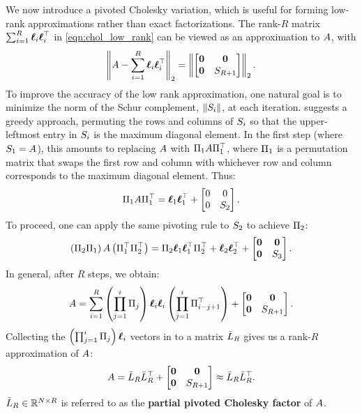 We now introduce a pivoted Cholesky variation, which is useful for forming low-rank approximations rather than exact factorizations.
The rank-$R$ matrix $\sum_{i=1}^{R}{\boldsymbol{\ell}}_{i}{\boldsymbol{\ell}}_{i}^{\top}$ in \cref{eqn:chol_low_rank} can be viewed as an approximation to $A$, with
$$
  \left\Vert A - \sum_{i=1}^{R}{\boldsymbol{\ell}}_{i}{\boldsymbol{\ell}}_{i}^{\top} \right\Vert_{2} = \left\Vert \begin{bmatrix} \mathbf{0} & \mathbf{0} \\ \mathbf{0} & S_{R+1} \end{bmatrix} \right\Vert_2.
$$
%
To improve the accuracy of the low rank approximation, one natural goal is to minimize the norm of the Schur complement, $\Vert S_{i} \Vert$, at each iteration.
\citet{harbrecht2012low} suggests a greedy approach, permuting the rows and columns of $S_{i}$ so that the upper-leftmost entry in $S_{i}$ is the maximum diagonal element.
In the first step (where $S_1 = A$), this amounts to replacing $A$ with $\Pi_{1} A \Pi_{1}^\top$, where $\Pi_{1}$ is a permutation matrix that swaps the first row and column with whichever row and column corresponds to the maximum diagonal element.
Thus:
%
\begin{align*}
  \Pi_{1} A \Pi_{1}^\top = \boldsymbol{\ell}_{1}\boldsymbol{\ell}_{1}^{\top} + \begin{bmatrix} 0 & 0 \\ 0 & S_2 \end{bmatrix}.
\end{align*}
%
To proceed, one can apply the same pivoting rule to $S_2$ to achieve $\Pi_{2}$:
%
\begin{align*}
  \left( \Pi_{2} \Pi_{1} \right) A \left( \Pi_{1}^\top \Pi_{2}^\top \right) = \Pi_{2} \boldsymbol{\ell}_{1}\boldsymbol{\ell}_{1}^{\top} \Pi_2^\top
  + \boldsymbol{\ell}_2 \boldsymbol{\ell}_2^\top + \begin{bmatrix} \mathbf{0} & \mathbf{0} \\ \mathbf{0} & S_3 \end{bmatrix}.
\end{align*}
%
In general, after $R$ steps, we obtain:
\begin{align}
  A = \sum_{i=1}^{R} \left( \prod_{j=1}^i \Pi_j \right) {\boldsymbol{\ell}}_{i} {\boldsymbol{\ell}}_{i} \left( \prod_{j=1}^i \Pi_{i-j+1}^\top \right)
  + \begin{bmatrix} \mathbf{0} & \mathbf{0} \\ \mathbf{0} & S_{R+1} \end{bmatrix}.
\end{align}
Collecting the $\left( \prod_{j=1}^i \Pi_j \right) {\boldsymbol{\ell}}_{i}$ vectors in to a matrix $\bar{L}_R$ gives us a rank-$R$ approximation of $A$:
%
\begin{equation}
  A = \bar{L}_{R} \bar{L}_{R}^{\top} + \begin{bmatrix} \mathbf{0} & \mathbf{0} \\ \mathbf{0} & S_{R+1} \end{bmatrix} \approx \bar{L}_{R} \bar{L}_{R}^{\top}.
  \label{eqn:chol_error}
\end{equation}
%
$\bar{L}_{R} \in \mathbb{R}^{N \times R}$ is referred to as the {\bf partial pivoted Cholesky factor} of $A$.


